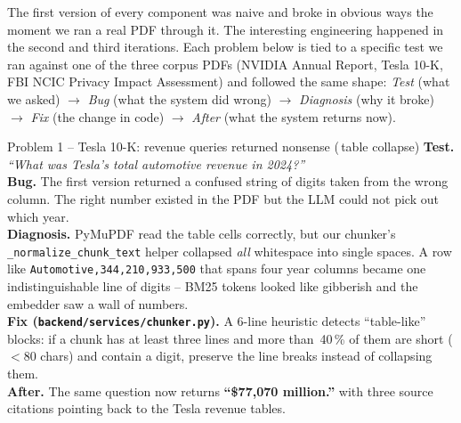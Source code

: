 \documentclass[11pt,a4paper]{article}
\begin{document}
The first version of every component was naive and broke in obvious ways
the moment we ran a real PDF through it. The interesting engineering
happened in the second and third iterations. Each problem below is tied to
a specific test we ran against one of the three corpus PDFs (NVIDIA
Annual Report, Tesla 10-K, FBI NCIC Privacy Impact Assessment) and
followed the same shape: \emph{Test} (what we asked) $\to$ \emph{Bug}
(what the system did wrong) $\to$ \emph{Diagnosis} (why it broke)
$\to$ \emph{Fix} (the change in code) $\to$ \emph{After} (what the system
returns now).

\begin{problembox}{Problem 1 -- Tesla 10-K: revenue queries returned nonsense (\,table collapse)}
\textbf{Test.}
\textit{``What was Tesla's total automotive revenue in 2024?''}\\[2pt]
\textbf{Bug.}
The first version returned a confused string of digits taken from the
wrong column. The right number existed in the PDF but the LLM could not
pick out which year.\\[2pt]
\textbf{Diagnosis.}
PyMuPDF read the table cells correctly, but our chunker's
\texttt{\_normalize\_chunk\_text} helper collapsed \emph{all} whitespace
into single spaces. A row like
\texttt{Automotive,344,210,933,500} that spans four year
columns became one indistinguishable line of digits -- BM25 tokens looked
like gibberish and the embedder saw a wall of numbers.\\[2pt]
\textbf{Fix (\texttt{backend/services/chunker.py}).}
A 6-line heuristic detects ``table-like'' blocks: if a chunk has at least
three lines and more than~40\,\% of them are short ($<\!80$ chars) and
contain a digit, preserve the line breaks instead of collapsing them.\\[2pt]
\textbf{After.}
The same question now returns \textbf{``\$77{,}070 million.''} with three
source citations pointing back to the Tesla revenue tables.
\end{problembox}
\end{document}
